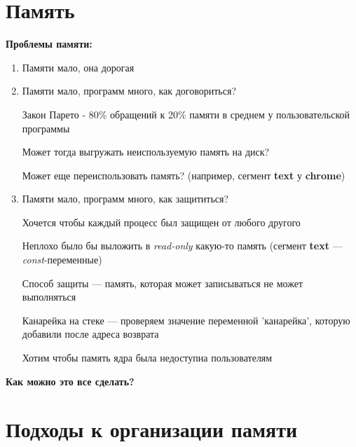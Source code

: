 \documentclass[../../lectures.tex]{subfiles}
\begin{document}
\section{Память}
\textbf{Проблемы памяти:}
\begin{enumerate}
    \item Памяти мало, она дорогая
    \item Памяти мало, программ много, как договориться?

          Закон Парето - 80\% обращений к 20\% памяти в среднем у пользовательской программы

          Может тогда выгружать неиспользуемую память на диск?

          Может еще переиспользовать память? (например, сегмент \textbf{text} у \textbf{chrome})
    \item Памяти мало, программ много, как защититься?

          Хочется чтобы каждый процесс был защищен от любого другого

          Неплохо было бы выложить в \emph{read-only} какую-то память 
          (сегмент \textbf{text} --- \emph{const}-переменные)


          Способ защиты --- память, которая может записываться не может выполняться

          Канарейка на стеке --- проверяем значение переменной 'канарейка', которую добавили после адреса возврата

          Хотим чтобы память ядра была недоступна пользователям
\end{enumerate}
\begin{center}\textbf{Как можно это все сделать?}\end{center}

\newpage
\section{Подходы к организации памяти}
\end{document}

